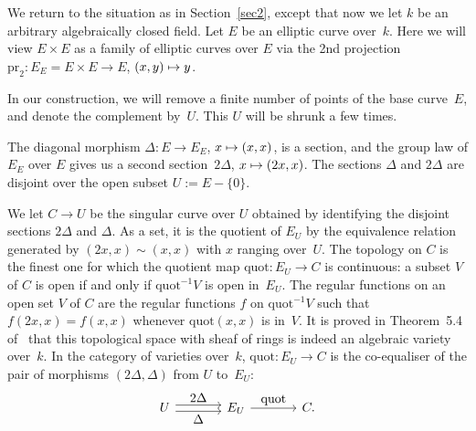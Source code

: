 \documentclass[JEP,XML,SOM,Unicode,NoFloatCountersInSection]{cedram}
\def\mto{\mathchoice{\longmapsto}{\mapsto}{\mapsto}{\mapsto}}
\theoremstyle{plain}
\theoremstyle{definition}
\numberwithin{equation}{subsection}
\newcommand{\pr}{\mathrm{pr}}
\newcommand{\quot}{\mathrm{quot}}
\begin{document}
We return to the situation as in Section~\ref{sec2}, except that now
we let $k$ be an arbitrary algebraically closed field. Let $E$ be an
elliptic curve over~$k$. Here we will view $E\times E$ as a family of
elliptic curves over $E$ via the 2nd projection $\pr_2\colon E_E =
E\times E\to E$, $(x,y)\mto y$.

In our construction, we will remove a finite number of points of the
base curve~$E$, and denote the complement by~$U$. This $U$ will be
shrunk a few times.

The diagonal morphism $\Delta\colon E\to E_E$, $x\mto(x,x)$, is a
section, and the group law of $E_E$ over $E$ gives us a second
section~$2\Delta$, $x\mto (2x,x)$. The sections $\Delta$ and
$2\Delta$ are disjoint over the open subset $U:=E-\{0\}$.

We let $C\to U$ be the singular curve over $U$ obtained by identifying
the disjoint sections $2\Delta$ and $\Delta$. As a set, it is the
quotient of $E_U$ by the equivalence relation generated by
$(2x,x)\sim (x,x)$ with $x$ ranging over~$U$. The topology on $C$
is the finest one for which the quotient map $\quot\colon E_U\to C$
is continuous: a subset $V$ of $C$ is open if and only if
$\quot^{-1}V$ is open in~$E_U$. The regular functions on an open
set $V$ of $C$ are the regular functions $f$ on $\quot^{-1}V$ such
that $f(2x,x)=f(x,x)$ whenever $\quot(x,x)$ is in~$V$. It is
proved in Theorem~5.4 of~\cite{Ferrand} that this topological space with sheaf
of rings is indeed an algebraic variety over~$k$. In the category of
varieties over~$k$, $\quot\colon E_U\to C$ is the co-equaliser of the pair of
morphisms $(2\Delta,\Delta)$ from $U$ to~$E_U$:\vspace*{-3pt}\enlargethispage{.5\baselineskip}%
\[
\begin{tikzcd}[column sep= large]
U \ar[r,shift left,"\textstyle 2\Delta"] \ar[r,shift right,"\textstyle \Delta"']& E_U \ar[r,"\textstyle \quot"]& C.
\end{tikzcd}
\]
\end{document}
